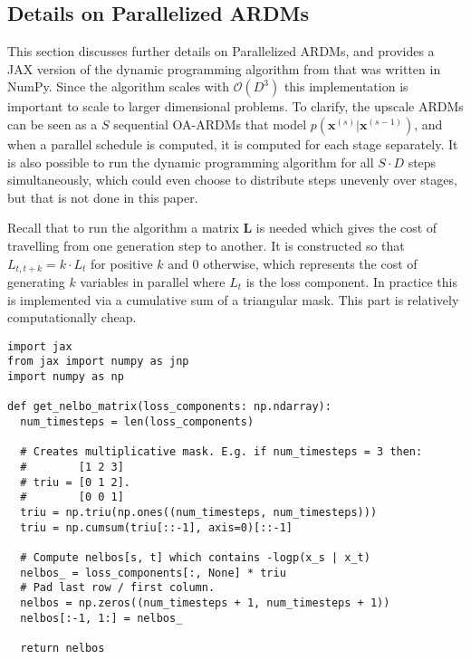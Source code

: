 \documentclass{article} \usepackage{iclr2022_conference,times}
\def\vx{{\bm{x}}}
\begin{document}
\newpage
\subsection{Details on Parallelized ARDMs}
This section discusses further details on Parallelized ARDMs, and provides a JAX version of the dynamic programming algorithm from \citep{watson2021learningefficientlysample} that was written in NumPy. Since the algorithm scales with $\mathcal{O}(D^3)$ this implementation is important to scale to larger dimensional problems. To clarify, the upscale ARDMs can be seen as a $S$ sequential OA-ARDMs that model $p(\vx^{(s)} | \vx^{(s-1)})$, and when a parallel schedule is computed, it is computed for each stage separately. It is also possible to run the dynamic programming algorithm for all $S 
\cdot D$ steps simultaneously, which could even choose to distribute steps unevenly over stages, but that is not done in this paper. 



Recall that to run the algorithm a matrix $\mathbf{L}$ is needed which gives the cost of travelling from one generation step to another. It is constructed so that $L_{t,t+k} = k \cdot L_t$ for positive $k$ and $0$ otherwise, which represents the cost of generating $k$ variables in parallel where $L_t$ is the loss component. In practice this is implemented via a cumulative sum of a triangular mask. This part is relatively computationally cheap.
\begin{lstlisting}
import jax
from jax import numpy as jnp
import numpy as np

def get_nelbo_matrix(loss_components: np.ndarray):
  num_timesteps = len(loss_components)

  # Creates multiplicative mask. E.g. if num_timesteps = 3 then:
  #        [1 2 3]
  # triu = [0 1 2].
  #        [0 0 1]
  triu = np.triu(np.ones((num_timesteps, num_timesteps)))
  triu = np.cumsum(triu[::-1], axis=0)[::-1]

  # Compute nelbos[s, t] which contains -logp(x_s | x_t)
  nelbos_ = loss_components[:, None] * triu
  # Pad last row / first column.
  nelbos = np.zeros((num_timesteps + 1, num_timesteps + 1))
  nelbos[:-1, 1:] = nelbos_

  return nelbos
\end{lstlisting}
\end{document}
